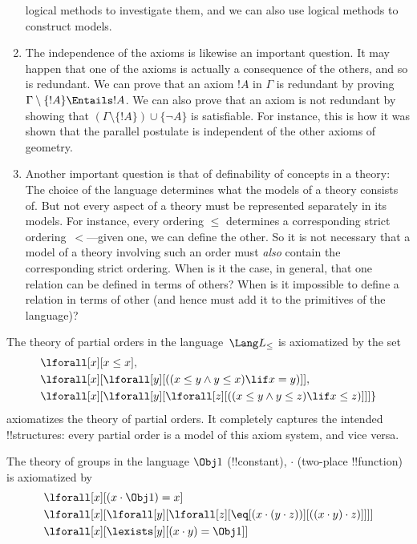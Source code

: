 \documentclass[../../include/open-logic-section]{subfiles}
\begin{document}
\begin{explain}
\begin{enumerate}
  logical methods to investigate them, and we can also use logical
  methods to construct models.
\item The independence of the axioms is likewise an important
  question.  It may happen that one of the axioms is actually a
  consequence of the others, and so is redundant.  We can prove that
  an axiom $!A$ in $\Gamma$ is redundant by proving $\Gamma \setminus
  \{!A\} \Entails !A$.  We can also prove that an axiom is not
  redundant by showing that $(\Gamma \setminus \{!A\}) \cup \{\lnot
  A\}$ is satisfiable. For instance, this is how it was shown that the
  parallel postulate is independent of the other axioms of geometry.
\item Another important question is that of definability of concepts
  in a theory: The choice of the language determines what the models
  of a theory consists of. But not every aspect of a theory must be
  represented separately in its models.  For instance, every ordering
  $\le$ determines a corresponding strict ordering~$<$---given one, we
  can define the other.  So it is not necessary that a model of a
  theory involving such an order must \emph{also} contain the
  corresponding strict ordering.  When is it the case, in general,
  that one relation can be defined in terms of others?  When is it
  impossible to define a relation in terms of other (and hence must
  add it to the primitives of the language)?
\end{enumerate}
\end{explain}

\begin{ex}
The theory of partial orders in the language~$\Lang L_\le$ is
axiomatized by the set
\begin{align*}
& \lforall[x][x \le x], \\
& \lforall[x][\lforall[y][((x \le y \land y \le
    x) \lif x = y)]], \\
& \lforall[x][\lforall[y][\lforall[z][((x \le y
      \land y \le z) \lif x \le z)]]]\}
\end{align*}
axiomatizes the theory of partial orders. It completely captures the
intended !!{structure}s: every partial order is a model of this axiom
system, and vice versa.
\end{ex}

\begin{ex}
The theory of groups in the language $\Obj 1$ (!!{constant}), $\cdot$
(two-place !!{function}) is axiomatized by
\begin{align*}
& \lforall[x][(x \cdot \Obj 1) = x]\\ 
& \lforall[x][\lforall[y][\lforall[z][\eq[(x \cdot (y \cdot z))][((x
          \cdot y) \cdot z)]]]]\\
& \lforall[x][\lexists[y][(x \cdot y) = \Obj 1]]
\end{align*}
\end{ex}
\end{document}
